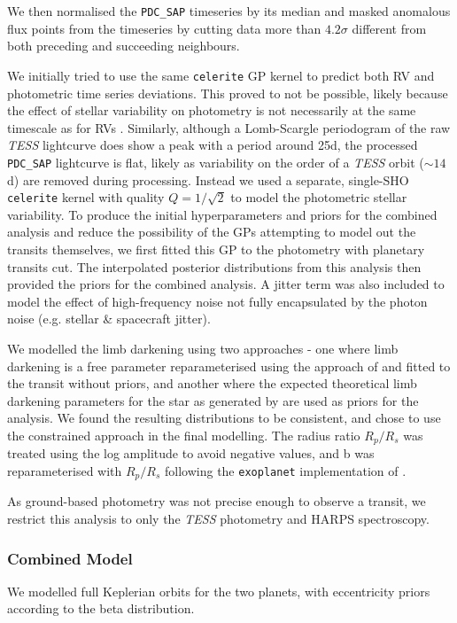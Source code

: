 \documentclass[fleqn,usenatbib]{mnras}
\newcommand{\tess}{{\it TESS}}
\newcommand{\harps}{{HARPS}}
\begin{document}
We then normalised the \texttt{PDC\_SAP} timeseries by its median and masked anomalous flux points from the timeseries by cutting data more than $4.2\sigma$ different from both preceding and succeeding neighbours.

We initially tried to use the same \texttt{celerite} GP kernel to predict both RV and photometric time series deviations.
This proved to not be possible, likely because the effect of stellar variability on photometry is not necessarily at the same timescale as for RVs \citep{10.1111/j.1365-2966.2011.19960.x}.
Similarly, although a Lomb-Scargle periodogram of the raw \tess{} lightcurve does show a peak with a period around 25d, the processed \texttt{PDC\_SAP} lightcurve is flat, likely as variability on the order of a \tess{} orbit ($\sim 14$\,d) are removed during processing.
Instead we used a separate, single-SHO \texttt{celerite} kernel with quality $Q=1/\sqrt{2}$ to model the photometric stellar variability.
To produce the initial hyperparameters and priors for the combined analysis and reduce the possibility of the GPs attempting to model out the transits themselves, we first fitted this GP to the photometry with planetary transits cut. The interpolated posterior distributions from this analysis then provided the priors for the combined analysis.
A jitter term was also included to model the effect of high-frequency noise not fully encapsulated by the photon noise (e.g. stellar \& spacecraft jitter).

We modelled the limb darkening using two approaches - one where limb darkening is a free parameter reparameterised using the approach of \citet{kipping2013efficient} and fitted to the transit without priors, and another where the expected theoretical limb darkening parameters for the star as generated by \citet{claret2017limb} are used as priors for the analysis.
We found the resulting distributions to be consistent, and chose to use the constrained approach in the final modelling.
The radius ratio $R_p/R_s$ was treated using the log amplitude to avoid negative values, and b was reparameterised with $R_p/R_s$ following the \texttt{exoplanet} implementation of \citet{espinoza2018efficient}.

As ground-based photometry was not precise enough to observe a transit, we restrict this analysis to only the \tess{} photometry and \harps{} spectroscopy.

\subsubsection{Combined Model}
We modelled full Keplerian orbits for the two planets, with eccentricity priors according to the \citet{kipping2013parametrizing} beta distribution.
\end{document}
